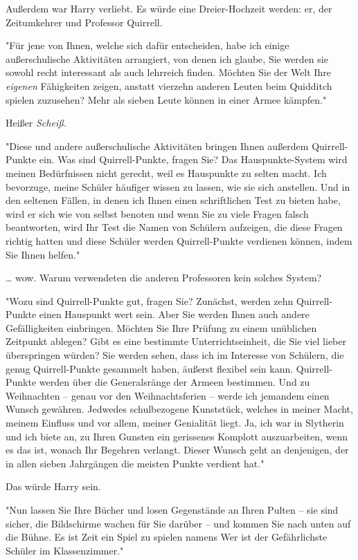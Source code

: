 {Außerdem war Harry verliebt. Es würde eine Dreier-Hochzeit werden: er, der Zeitumkehrer und Professor Quirrell.

"Für jene von Ihnen, welche sich dafür entscheiden, habe ich einige außerschulische Aktivitäten arrangiert, von denen ich glaube, Sie werden sie sowohl recht interessant als auch lehrreich finden. Möchten Sie der Welt Ihre \emph{eigenen} Fähigkeiten zeigen, anstatt vierzehn anderen Leuten beim Quidditch spielen zuzusehen? Mehr als sieben Leute können in einer Armee kämpfen."

Heißer \emph{Scheiß.}

"Diese und andere außerschulische Aktivitäten bringen Ihnen außerdem Quirrell-Punkte ein. Was sind Quirrell-Punkte, fragen Sie? Das Hauspunkte-System wird meinen Bedürfnissen nicht gerecht, weil es Hauspunkte zu selten macht. Ich bevorzuge, meine Schüler häufiger wissen zu lassen, wie sie sich anstellen. Und in den seltenen Fällen, in denen ich Ihnen einen schriftlichen Test zu bieten habe, wird er sich wie von selbst benoten und wenn Sie zu viele Fragen falsch beantworten, wird Ihr Test die Namen von Schülern aufzeigen, die diese Fragen richtig hatten und diese Schüler werden Quirrell-Punkte verdienen können, indem Sie Ihnen helfen."

… wow. Warum verwendeten die anderen Professoren kein solches System?

"Wozu sind Quirrell-Punkte gut, fragen Sie? Zunächst, werden zehn Quirrell-Punkte einen Hauspunkt wert sein. Aber Sie werden Ihnen auch andere Gefälligkeiten einbringen. Möchten Sie Ihre Prüfung zu einem unüblichen Zeitpunkt ablegen? Gibt es eine bestimmte Unterrichtseinheit, die Sie viel lieber überspringen würden? Sie werden sehen, dass ich im Interesse von Schülern, die genug Quirrell-Punkte gesammelt haben, äußerst flexibel sein kann. Quirrell-Punkte werden über die Generalsränge der Armeen bestimmen. Und zu Weihnachten -- genau vor den Weihnachtsferien -- werde ich jemandem einen Wunsch gewähren. Jedwedes schulbezogene Kunststück, welches in meiner Macht, meinem Einfluss und vor allem, meiner Genialität liegt. Ja, ich war in Slytherin und ich biete an, zu Ihren Gunsten ein gerissenes Komplott auszuarbeiten, wenn es das ist, wonach Ihr Begehren verlangt. Dieser Wunsch geht an denjenigen, der in allen sieben Jahrgängen die meisten Punkte verdient hat."

Das würde Harry sein.

"Nun lassen Sie Ihre Bücher und losen Gegenstände an Ihren Pulten -- sie sind sicher, die Bildschirme wachen für Sie darüber -- und kommen Sie nach unten auf die Bühne. Es ist Zeit ein Spiel zu spielen namens Wer ist der Gefährlichste Schüler im Klassenzimmer."

}
